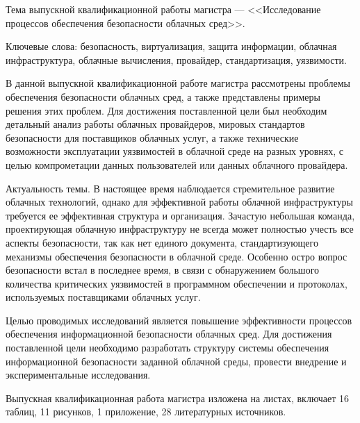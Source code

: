 
Тема выпускной квалификационной работы магистра --- <<Исследование процессов обеспечения безопасности облачных сред>>.

Ключевые слова: безопасность, виртуализация, защита информации, облачная инфраструктура, облачные вычисления, провайдер, стандартизация, уязвимости.

В данной выпускной квалификационной работе магистра рассмотрены проблемы обеспечения безопасности облачных сред, а также представлены примеры решения этих проблем.
Для достижения поставленной цели был необходим детальный анализ работы облачных провайдеров, мировых стандартов безопасности для поставщиков облачных услуг, а также технические возможности эксплуатации уязвимостей в облачной среде на разных уровнях, с целью компрометации данных пользователей или данных облачного провайдера.

Актуальность темы.
В настоящее время наблюдается стремительное развитие облачных технологий, однако для эффективной работы облачной инфраструктуры требуется ее эффективная структура и организация.
Зачастую небольшая команда, проектирующая облачную инфраструктуру не всегда может полностью учесть все аспекты безопасности, так как нет единого документа, стандартизующего механизмы обеспечения безопасности в облачной среде.
Особенно остро вопрос безопасности встал в последнее время, в связи с обнаружением большого количества критических уязвимостей в программном обеспечении и протоколах, используемых поставщиками облачных услуг.

Целью проводимых исследований является повышение эффективности процессов обеспечения информационной безопасности облачных сред.
Для достижения поставленной цели необходимо разработать структуру системы обеспечения информационной безопасности  заданной облачной среды, провести внедрение и экспериментальные исследования.

Выпускная квалификационная работа магистра изложена на \pageref{LastPage} листах, включает 16 таблиц, 11 рисунков, 1 приложение, 28 литературных источников.

\clearpage

